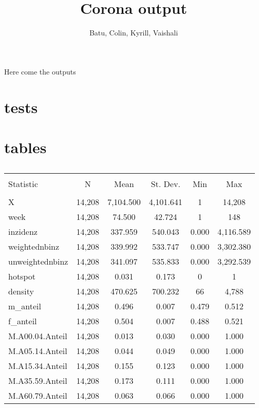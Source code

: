 \documentclass{article}
\title{Corona output}
\author{Batu, Colin, Kyrill, Vaishali}
\date{}
\begin{document}
\maketitle

Here come the outputs

\section{tests}


\section{tables}

\begin{table}[!htbp] \centering 
  \caption{} 
  \label{} 
\begin{tabular}{@{\extracolsep{5pt}}lccccc} 
\\[-1.8ex]\hline 
\hline \\[-1.8ex] 
Statistic & \multicolumn{1}{c}{N} & \multicolumn{1}{c}{Mean} & \multicolumn{1}{c}{St. Dev.} & \multicolumn{1}{c}{Min} & \multicolumn{1}{c}{Max} \\ 
\hline \\[-1.8ex] 
X & 14,208 & 7,104.500 & 4,101.641 & 1 & 14,208 \\ 
week & 14,208 & 74.500 & 42.724 & 1 & 148 \\ 
inzidenz & 14,208 & 337.959 & 540.043 & 0.000 & 4,116.589 \\ 
weightednbinz & 14,208 & 339.992 & 533.747 & 0.000 & 3,302.380 \\ 
unweightednbinz & 14,208 & 341.097 & 535.833 & 0.000 & 3,292.539 \\ 
hotspot & 14,208 & 0.031 & 0.173 & 0 & 1 \\ 
density & 14,208 & 470.625 & 700.232 & 66 & 4,788 \\ 
m\_anteil & 14,208 & 0.496 & 0.007 & 0.479 & 0.512 \\ 
f\_anteil & 14,208 & 0.504 & 0.007 & 0.488 & 0.521 \\ 
M.A00.04.Anteil & 14,208 & 0.013 & 0.030 & 0.000 & 1.000 \\ 
M.A05.14.Anteil & 14,208 & 0.044 & 0.049 & 0.000 & 1.000 \\ 
M.A15.34.Anteil & 14,208 & 0.155 & 0.123 & 0.000 & 1.000 \\ 
M.A35.59.Anteil & 14,208 & 0.173 & 0.111 & 0.000 & 1.000 \\ 
M.A60.79.Anteil & 14,208 & 0.063 & 0.066 & 0.000 & 1.000 \\ 

\end{tabular}
\end{table}
\end{document}
